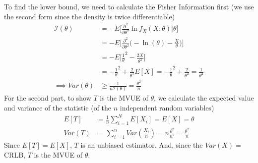 \documentclass[../../probability-notes.tex]{subfiles}
\begin{document}
    To find the lower bound, we need to calculate the Fisher Information first (we use the second form since the density is twice differentiable)
    \begin{align*}
        \mathcal{I}(\theta) &= -E \bigg[ \frac{\partial^{2}}{\partial \theta^{2}} \ln f_{X}(X; \theta) \bigg \vert \theta \bigg]\\
        &= -E \bigg[ \frac{\partial^{2}}{\partial \theta^{2}} \bigg(-\ln(\theta) - \frac{X}{\theta} \bigg) \bigg]\\
        &= -E \bigg[ \frac{1}{\theta}^{2} - \frac{2X}{\theta^{3}} \bigg]\\
        &= -\frac{1}{\theta}^{2} + \frac{2}{\theta^{3}}E[X] = -\frac{1}{\theta}^{2} + \frac{2}{\theta^{2}} = \frac{1}{\theta^{2}}\\
        \implies Var(\theta) &\geq \frac{1}{n\mathcal{I}(\theta)} = \frac{\theta^{2}}{n}
    \end{align*}
    For the second part, to show $T$ is the MVUE of $\theta$, we calculate the expected value and variance of the statistic (of the $n$ independent random variables)
    \begin{align*}
        E[T] &= \frac{1}{n} \sum_{i=1}^{N}E[X_{i}] = E[X] = \theta\\
        Var(T) &= \sum_{i=1}^{n} Var(\frac{X_{i}}{n}) = n\frac{\theta^{2}}{n^{2}} = \frac{\theta^{2}}{n}
    \end{align*}
    Since $E[T] = E[X]$, $T$ is an unbiased estimator. And, since the $Var(X) =$ CRLB, $T$ is the MVUE of $\theta$.
\end{document}
